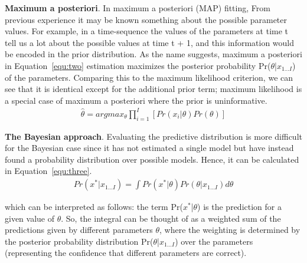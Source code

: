 \documentclass[10pt,twocolumn,letterpaper]{article}
\begin{document}
\textbf{Maximum a posteriori}. In maximum a posteriori (MAP) fitting, From previous experience it may be known something about the possible parameter values. For example, in a time-sequence the values of the parameters at time t tell us a lot about the possible values at time t + 1, and this information would be encoded in the prior distribution. As the name suggests, maximum a posteriori in Equation~\ref{equ:two} estimation maximizes the posterior probability Pr($\theta$|$x_{1...I}$) of the parameters. Comparing this to the maximum likelihood criterion, we can see that it is identical except for the additional prior term; maximum likelihood is a special case of maximum a posteriori where the prior is uninformative.\\
\begin{equation}
\begin{split}
  \label{equ:two}
\hat{\theta} =  argmax _{\theta}\prod_{i = 1}^{I} [Pr(x_i|\theta)Pr(\theta)]
\end{split}
\end{equation}
\par \textbf{The Bayesian approach}. Evaluating the predictive distribution is more difficult for the Bayesian case since it has not estimated a single model but have instead found a probability distribution over possible models. Hence, it can be calculated in Equation~\ref{equ:three}.\\
\begin{equation}
\begin{split}
  \label{equ:three}
Pr(x^*|x_{1...I}) =  \int Pr(x^*|\theta)Pr(\theta|x_{1...I})d\theta
\end{split}
\end{equation}
\par which can be interpreted as follows: the term Pr($x^*$|$\theta$) is the prediction for a given value of $\theta$. So, the integral can be thought of as a weighted sum of the predictions given by different parameters $\theta$, where the weighting is determined by the posterior probability distribution Pr($\theta$|$x_{1...I}$) over the parameters (representing the confidence that different parameters are correct).


{\small


}
\end{document}
